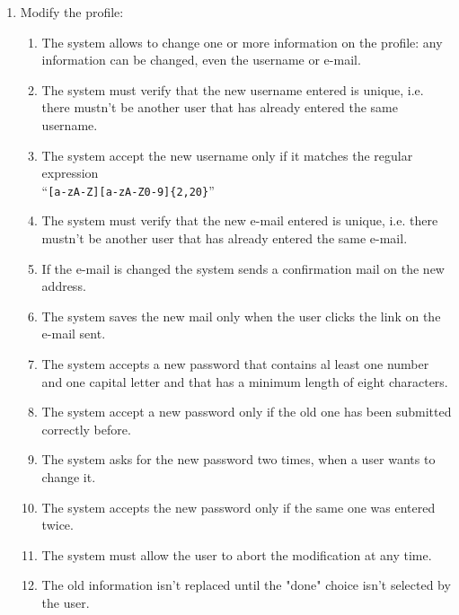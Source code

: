 \begin{enumerate}
\item Modify the profile:
\begin{enumerate}
\item The system allows to change one or more information on the profile: any information can be changed, even the username or e-mail. 
\item The system must verify that the new username entered is unique, i.e. there mustn't be another user that has already entered the same username.  \label{f-modify-usrn1}
\item  The system accept the new username only if it matches the regular expression\\``\texttt{[a-zA-Z][a-zA-Z0-9]\{2,20\}}''   \label{f-modify-usrn2} 
\item The system must verify that the new e-mail entered is unique, i.e. there mustn't be another user that has already entered the same e-mail.   \label{f-modify-mail1}
\item If the e-mail is changed the system sends a confirmation mail on the new address.
\item The system saves the new mail only when the user clicks the link on the e-mail sent.   \label{f-modify-mail2}
\item The system accepts a new password that contains al least one number and one capital letter and that has a minimum length of eight characters.   \label{f-modify-pswd1}
\item The system accept a new password only if the old one has been submitted correctly before.  \label{f-modify-pswd2}
\item The system asks for the new password two times, when a user wants to change it. 
\item The system accepts the new password only if the same one was entered twice.  \label{f-modify-pswd3}
\item The system must allow the user to abort the modification at any time.
\item The old information isn't  replaced until the "done" choice isn't selected by the user.
\end{enumerate}




\end{enumerate}




